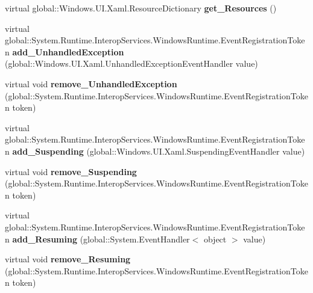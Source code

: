 \begin{DoxyCompactItemize}
virtual global\+::\+Windows.\+U\+I.\+Xaml.\+Resource\+Dictionary {\bfseries get\+\_\+\+Resources} ()
\item 
\mbox{\label{class_windows_1_1_u_i_1_1_xaml_1_1_application_a3fdd0d36fb6e5880c92fd8b205ab9cda}} 
virtual global\+::\+System.\+Runtime.\+Interop\+Services.\+Windows\+Runtime.\+Event\+Registration\+Token {\bfseries add\+\_\+\+Unhandled\+Exception} (global\+::\+Windows.\+U\+I.\+Xaml.\+Unhandled\+Exception\+Event\+Handler value)
\item 
\mbox{\label{class_windows_1_1_u_i_1_1_xaml_1_1_application_ab4bbcd1b2fae8d35eae530ebe85732ba}} 
virtual void {\bfseries remove\+\_\+\+Unhandled\+Exception} (global\+::\+System.\+Runtime.\+Interop\+Services.\+Windows\+Runtime.\+Event\+Registration\+Token token)
\item 
\mbox{\label{class_windows_1_1_u_i_1_1_xaml_1_1_application_ac22db715c72a7c090a65a2657417c4e6}} 
virtual global\+::\+System.\+Runtime.\+Interop\+Services.\+Windows\+Runtime.\+Event\+Registration\+Token {\bfseries add\+\_\+\+Suspending} (global\+::\+Windows.\+U\+I.\+Xaml.\+Suspending\+Event\+Handler value)
\item 
\mbox{\label{class_windows_1_1_u_i_1_1_xaml_1_1_application_a697beee9101ae37839824e38fb697688}} 
virtual void {\bfseries remove\+\_\+\+Suspending} (global\+::\+System.\+Runtime.\+Interop\+Services.\+Windows\+Runtime.\+Event\+Registration\+Token token)
\item 
\mbox{\label{class_windows_1_1_u_i_1_1_xaml_1_1_application_aebc7735fefc7c00f75274d1e1dad4cc1}} 
virtual global\+::\+System.\+Runtime.\+Interop\+Services.\+Windows\+Runtime.\+Event\+Registration\+Token {\bfseries add\+\_\+\+Resuming} (global\+::\+System.\+Event\+Handler$<$ object $>$ value)
\item 
\mbox{\label{class_windows_1_1_u_i_1_1_xaml_1_1_application_ae71f03dad163a08e042d3b65126ad419}} 
virtual void {\bfseries remove\+\_\+\+Resuming} (global\+::\+System.\+Runtime.\+Interop\+Services.\+Windows\+Runtime.\+Event\+Registration\+Token token)

\end{DoxyCompactItemize}
